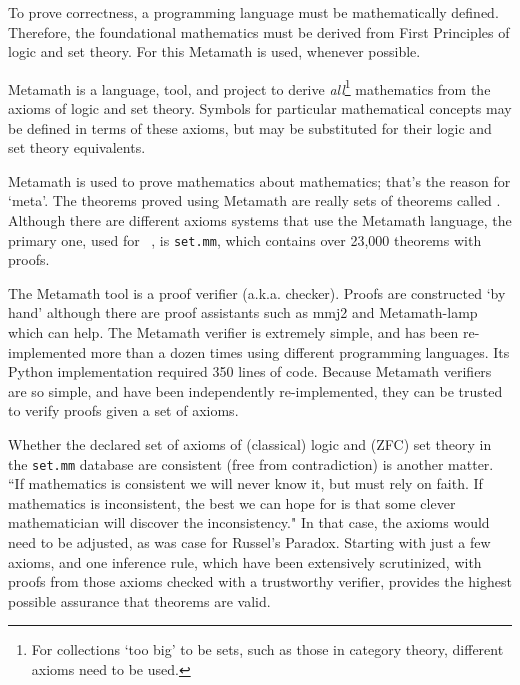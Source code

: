 

\pn To prove correctness, a programming language must be mathematically defined.  Therefore, the foundational mathematics must be derived from First Principles of logic and set theory.  For this Metamath is used, whenever possible.

\pn Metamath \cite{METAMATH} is a language, tool, and project to derive \emph{all}\footnote{For collections `too big' to be sets, such as those in category theory, different axioms need to be used.} mathematics from the axioms of logic and set theory.  Symbols for particular mathematical concepts may be defined in terms of these axioms, but may be substituted for their logic and set theory equivalents.

\pn  Metamath is used to prove mathematics about mathematics; that's the reason for `meta'.  The theorems proved using Metamath are really sets of theorems called .  Although there are different axioms systems that use the Metamath language, the primary one, used for \lang~, is \texttt{set.mm}, which contains over 23,000 theorems with proofs. 

\pn The Metamath tool is a proof verifier (a.k.a. checker).  Proofs are constructed `by hand' although there are proof assistants such as mmj2 and Metamath-lamp which can help.  
The Metamath verifier is extremely simple, and has been re-implemented more than a dozen times using different programming languages.  Its Python implementation required 350 lines of code.  Because Metamath verifiers are so simple, and have been independently re-implemented, they can be trusted to verify proofs given a set of axioms.

\pn Whether the declared set of axioms of (classical) logic and (ZFC) set theory in the \texttt{set.mm} database are consistent (free from contradiction) is another matter.  
``If mathematics is consistent we will never know it, but must rely on faith.  If mathematics is inconsistent, the best we can hope for is that some clever mathematician will discover the inconsistency." \cite{METAMATH} In that case, the axioms would need to be adjusted, as was case for Russel's Paradox.
Starting with just a few axioms, and one inference rule, which have been extensively scrutinized, with proofs from those axioms checked with a trustworthy verifier, provides the highest possible assurance that theorems are valid.

